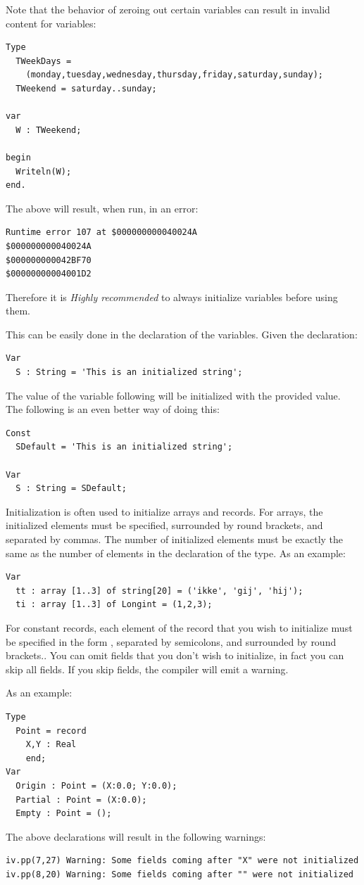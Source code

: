 Note that the behavior of zeroing out certain variables can result in invalid
content for variables:
\begin{verbatim}
Type
  TWeekDays =
    (monday,tuesday,wednesday,thursday,friday,saturday,sunday);
  TWeekend = saturday..sunday;

var
  W : TWeekend;

begin
  Writeln(W);
end.
\end{verbatim}
The above will result, when run, in an error:
\begin{verbatim}
Runtime error 107 at $000000000040024A
$000000000040024A
$000000000042BF70
$00000000004001D2
\end{verbatim}
Therefore it is {\em Highly recommended} to always initialize variables
before using them.

This can be easily done in the declaration of the variables.
Given the declaration:
\begin{verbatim}
Var
  S : String = 'This is an initialized string';
\end{verbatim}
The value of the variable following will be initialized with the provided
value. The following is an even better way of doing this:
\begin{verbatim}
Const
  SDefault = 'This is an initialized string';

Var
  S : String = SDefault;
\end{verbatim}
Initialization is often used to initialize arrays and records. For arrays,
the initialized elements must be specified, surrounded by round brackets, and
separated by commas. The number of initialized elements must be exactly the
same as the number of elements in the declaration of the type.
As an example:
\begin{verbatim}
Var
  tt : array [1..3] of string[20] = ('ikke', 'gij', 'hij');
  ti : array [1..3] of Longint = (1,2,3);
\end{verbatim}
For constant records, each element of the record that you wish to initialize
must be specified in the form , separated by semicolons,
and surrounded by round brackets.. You can omit
fields that you don't wish to initialize, in fact you can skip all fields.
If you skip fields, the compiler will emit a warning.

As an example:
\begin{verbatim}
Type
  Point = record
    X,Y : Real
    end;
Var
  Origin : Point = (X:0.0; Y:0.0);
  Partial : Point = (X:0.0);
  Empty : Point = ();
\end{verbatim}
The above declarations will result in the following warnings:
\begin{verbatim}
iv.pp(7,27) Warning: Some fields coming after "X" were not initialized
iv.pp(8,20) Warning: Some fields coming after "" were not initialized
\end{verbatim}

